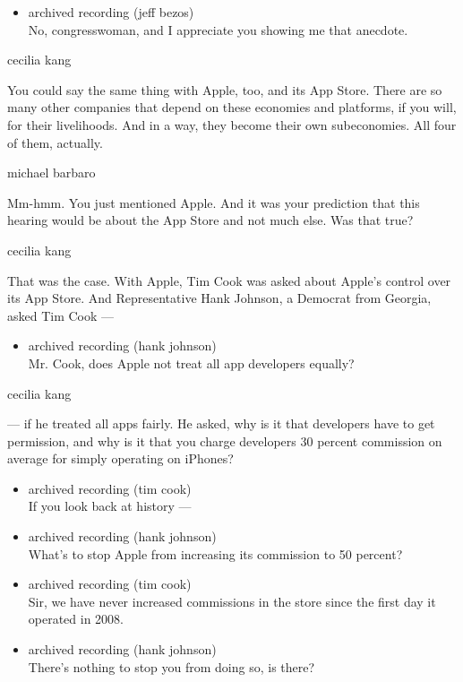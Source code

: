 \begin{itemize}
\tightlist
\item
  archived recording (jeff bezos)\\
  No, congresswoman, and I appreciate you showing me that anecdote.
\end{itemize}

cecilia kang

You could say the same thing with Apple, too, and its App Store. There
are so many other companies that depend on these economies and
platforms, if you will, for their livelihoods. And in a way, they become
their own subeconomies. All four of them, actually.

michael barbaro

Mm-hmm. You just mentioned Apple. And it was your prediction that this
hearing would be about the App Store and not much else. Was that true?

cecilia kang

That was the case. With Apple, Tim Cook was asked about Apple's control
over its App Store. And Representative Hank Johnson, a Democrat from
Georgia, asked Tim Cook ---

\begin{itemize}
\tightlist
\item
  archived recording (hank johnson)\\
  Mr. Cook, does Apple not treat all app developers equally?
\end{itemize}

cecilia kang

--- if he treated all apps fairly. He asked, why is it that developers
have to get permission, and why is it that you charge developers 30
percent commission on average for simply operating on iPhones?

\begin{itemize}
\item
  archived recording (tim cook)\\
  If you look back at history ---
\item
  archived recording (hank johnson)\\
  What's to stop Apple from increasing its commission to 50 percent?
\item
  archived recording (tim cook)\\
  Sir, we have never increased commissions in the store since the first
  day it operated in 2008.
\item
  archived recording (hank johnson)\\
  There's nothing to stop you from doing so, is there?
\end{itemize}

